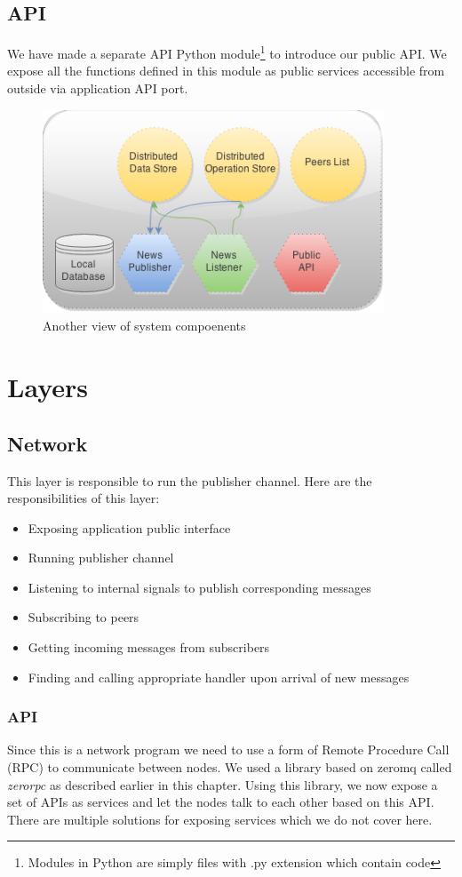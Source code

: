 \subsection{API}
We have made a separate API Python module\footnote{Modules in Python are simply files with .py extension which contain code}
to introduce our public API. 
We expose all the functions defined in this module as public services accessible from outside via application API port.

\begin{figure}[h]
  \centering
  \includegraphics[width=4in]{poster/figures/sys.png}
  \caption[Another view of system compoenents]
   {Another view of system compoenents}
\end{figure}

\section{Layers}
\subsection{Network}
This layer is responsible to run the publisher channel. 
Here are the responsibilities of this layer:

\begin{itemize}
\item Exposing application public interface
\item Running publisher channel
\item Listening to internal signals to publish corresponding messages
\item Subscribing to peers
\item Getting incoming messages from subscribers 
\item Finding and calling appropriate handler upon arrival of new messages
\end{itemize}

\subsubsection{API}
Since this is a network program we need to use a form of Remote Procedure Call (RPC) 
to communicate between nodes. We used a library based on zeromq 
called \textit{zerorpc} as described earlier in this chapter.
 Using this library, we now expose a set of APIs as services and let the nodes talk to 
each other based on this API. There are multiple solutions for exposing services which we do not cover here.

